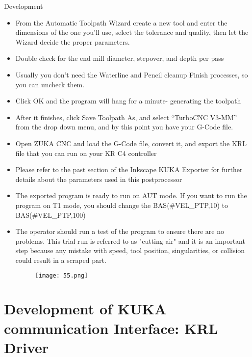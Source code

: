 \documentclass[a4paper]{book}
\begin{document}
\begin{chapter}{Development}
\begin{itemize}
\item From the Automatic Toolpath Wizard create a new tool and enter the dimensions of the one you’ll use, select the tolerance and quality, then let the Wizard decide the proper parameters.

\item Double check for the end mill diameter, stepover, and depth per pass 

\item Usually you don’t need the Waterline and Pencil cleanup Finish processes, so you can uncheck them.

\item Click OK and the program will hang for a minute- generating the toolpath 

\item After it finishes, click Save Toolpath As, and select “TurboCNC V3-MM” from the drop down menu, and by this point you have your G-Code file.

\item Open ZUKA CNC and load the G-Code file, convert it, and export the KRL file that you can run on your KR C4 controller

\item Please refer to the past section of the Inkscape KUKA Exporter for further details about the parameters used in this postprocessor

\item The exported program is ready to run on AUT mode. If you want to run the program on T1 mode, you should change the  
BAS(\#VEL\_PTP,10) to BAS(\#VEL\_PTP,100)

\item The operator should run a test of the program to ensure there are no problems. This trial run is referred to as "cutting air" and it is an important step because any mistake with speed, tool position, singularities, or collision could result in a scraped part.

\begin{figure}[H]
	\centering
	\texttt{[image: 55.png]}
\end{figure}
	
\end{itemize}
\section{Development of KUKA communication Interface: KRL Driver}


\end{chapter}
\end{document}
